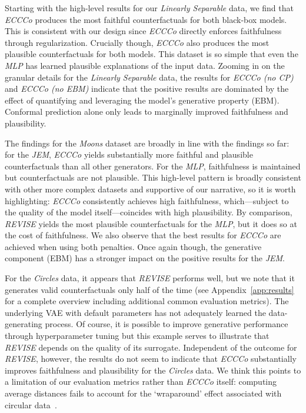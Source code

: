 Starting with the high-level results for our \textit{Linearly Separable} data, we find that \textit{ECCCo} produces the most faithful counterfactuals for both black-box models. This is consistent with our design since \textit{ECCCo} directly enforces faithfulness through regularization. Crucially though, \textit{ECCCo} also produces the most plausible counterfactuals for both models. This dataset is so simple that even the \textit{MLP} has learned plausible explanations of the input data. Zooming in on the granular details for the \textit{Linearly Separable} data, the results for \textit{ECCCo (no CP)} and \textit{ECCCo (no EBM)} indicate that the positive results are dominated by the effect of quantifying and leveraging the model's generative property (EBM). Conformal prediction alone only leads to marginally improved faithfulness and plausibility.

The findings for the \textit{Moons} dataset are broadly in line with the findings so far: for the \textit{JEM}, \textit{ECCCo} yields substantially more faithful and plausible counterfactuals than all other generators. For the \textit{MLP}, faithfulness is maintained but counterfactuals are not plausible. This high-level pattern is broadly consistent with other more complex datasets and supportive of our narrative, so it is worth highlighting: \textit{ECCCo} consistently achieves high faithfulness, which---subject to the quality of the model itself---coincides with high plausibility. By comparison, \textit{REVISE} yields the most plausible counterfactuals for the \textit{MLP}, but it does so at the cost of faithfulness. We also observe that the best results for \textit{ECCCo} are achieved when using both penalties. Once again though, the generative component (EBM) has a stronger impact on the positive results for the \textit{JEM}.

For the \textit{Circles} data, it appears that \textit{REVISE} performs well, but we note that it generates valid counterfactuals only half of the time (see Appendix~\ref{app:results} for a complete overview including additional common evaluation metrics). The underlying VAE with default parameters has not adequately learned the data-generating process. Of course, it is possible to improve generative performance through hyperparameter tuning but this example serves to illustrate that \textit{REVISE} depends on the quality of its surrogate. Independent of the outcome for \textit{REVISE}, however, the results do not seem to indicate that \textit{ECCCo} substantially improves faithfulness and plausibility for the \textit{Circles} data. We think this points to a limitation of our evaluation metrics rather than \textit{ECCCo} itself: computing average distances fails to account for the `wraparound' effect associated with circular data~\citep{gill2010circular}.

